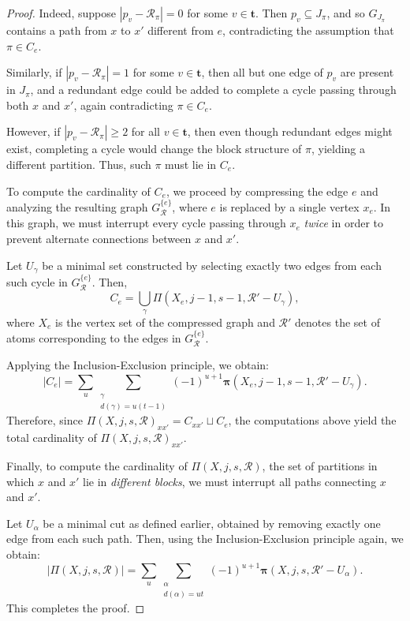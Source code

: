 \documentclass[10pt,a4paper]{amsart}
\begin{document}
\begin{proof}
		Indeed, suppose \( |p_v - \mathcal{R}_{\pi}| = 0 \) for some \( v \in \mathbf{t} \). Then \( p_v \subseteq J_{\pi} \), and so \( G_{J_{\pi}} \) contains a path from \( x \) to \( x' \) different from \( e \), contradicting the assumption that \( \pi \in C_e \).
		
		Similarly, if \( |p_v - \mathcal{R}_{\pi}| = 1 \) for some \( v \in \mathbf{t} \), then all but one edge of \( p_v \) are present in \( J_{\pi} \), and a redundant edge could be added to complete a cycle passing through both \( x \) and \( x' \), again contradicting \( \pi \in C_e \).
		
		However, if \( |p_v- \mathcal{R}_{\pi}| \geq 2 \) for all \( v \in \mathbf{t} \), then even though redundant edges might exist, completing a cycle would change the block structure of \( \pi \), yielding a different partition. Thus, such \( \pi \) must lie in \( C_e \).
		
		To compute the cardinality of \( C_e \), we proceed by compressing the edge \( e \) and analyzing the resulting graph \( G_{\mathcal{R}}^{\{e\}} \), where \( e \) is replaced by a single vertex \( x_e \). In this graph, we must interrupt every cycle passing through \( x_e \) \emph{twice} in order to prevent alternate connections between \( x \) and \( x' \).
		
		Let \( U_{\gamma} \) be a minimal set constructed by selecting exactly two edges from each such cycle in \( G_{\mathcal{R}}^{\{e\}} \). Then,
		\[
		C_e = \bigcup_{\gamma} \Pi(X_e, j - 1, s - 1, \mathcal{R}' - U_{\gamma}),
		\]
		where \( X_e \) is the vertex set of the compressed graph and \( \mathcal{R}' \) denotes the set of atoms corresponding to the edges in \( G_{\mathcal{R}}^{\{e\}} \).
		
		Applying the Inclusion-Exclusion principle, we obtain:
		\[
		|C_e| = \sum_u \sum_{\substack{\gamma \\ d(\gamma) = u(t - 1)}} (-1)^{u+1} \bm{\pi}(X_e, j - 1, s - 1, \mathcal{R}' - U_{\gamma}).
		\]
		Therefore, since \( \Pi(X, j, s, \mathcal{R})_{xx'} = C_{xx'} \sqcup C_e \), the computations above yield the total cardinality of \( \Pi(X, j, s, \mathcal{R})_{xx'} \).
		
		Finally, to compute the cardinality of \( \Pi(X, j, s, \mathcal{R}) \), the set of partitions in which \( x \) and \( x' \) lie in \emph{different blocks}, we must interrupt all paths connecting \( x \) and \( x' \).
		
		Let \( U_{\alpha} \) be a minimal cut as defined earlier, obtained by removing exactly one edge from each such path. Then, using the Inclusion-Exclusion principle again, we obtain:
		\[
		|\Pi(X, j, s, \mathcal{R})| = \sum_u \sum_{\substack{\alpha \\ d(\alpha) = ut}} (-1)^{u+1} \bm{\pi}(X, j, s, \mathcal{R}' - U_{\alpha}).
		\]
		This completes the proof.
	\end{proof}
\end{document}
